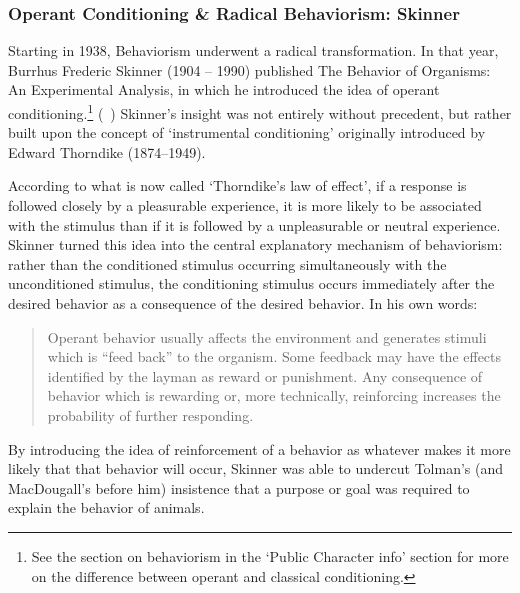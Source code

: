 \begin{refsection}
\subsubsection{Operant Conditioning \& Radical Behaviorism: Skinner}
\label{operantconditioningradicalbehaviorism:skinner}

Starting in 1938, Behaviorism underwent a radical transformation. In that year, Burrhus Frederic Skinner (1904 – 1990) published The Behavior of Organisms: An Experimental Analysis, in which he introduced the idea of operant conditioning.\footnote{See the section on behaviorism in the `Public Character info' section for more on the difference between operant and classical conditioning.} (~\citep{Anonymous:Auva_WZ2}) Skinner's insight was not entirely without precedent, but rather built upon the concept of `instrumental conditioning' originally introduced by Edward Thorndike (1874--1949). 

According to what is now called `Thorndike's law of effect', if a response is followed closely by a pleasurable experience, it is more likely to be associated with the stimulus than if it is followed by a unpleasurable or neutral experience. Skinner turned this idea into the central explanatory mechanism of behaviorism: rather than the conditioned stimulus occurring simultaneously with the unconditioned stimulus, the conditioning stimulus occurs immediately after the desired behavior as a consequence of the desired behavior. In his own words:

\begin{quote}

Operant behavior usually affects the environment and generates stimuli which is ``feed back'' to the organism. Some feedback may have the effects identified by the layman as reward or punishment. Any consequence of behavior which is rewarding or, more technically, reinforcing increases the probability of further responding. ~\citep[p. 129]{Skinner:1972wq}
\end{quote}

By introducing the idea of reinforcement of a behavior as whatever makes it more likely that that behavior will occur, Skinner was able to undercut Tolman's (and MacDougall's before him) insistence that a purpose or goal was required to explain the behavior of animals.


\end{refsection}
